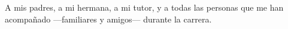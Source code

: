\begin{flushright}
    \begin{minipage}{0.35\textwidth}
    \small
    A mis padres, a mi hermana, a mi tutor, y a todas las personas que me han acompañado ---familiares y amigos--- durante la carrera.
    \end{minipage}
\end{flushright}
